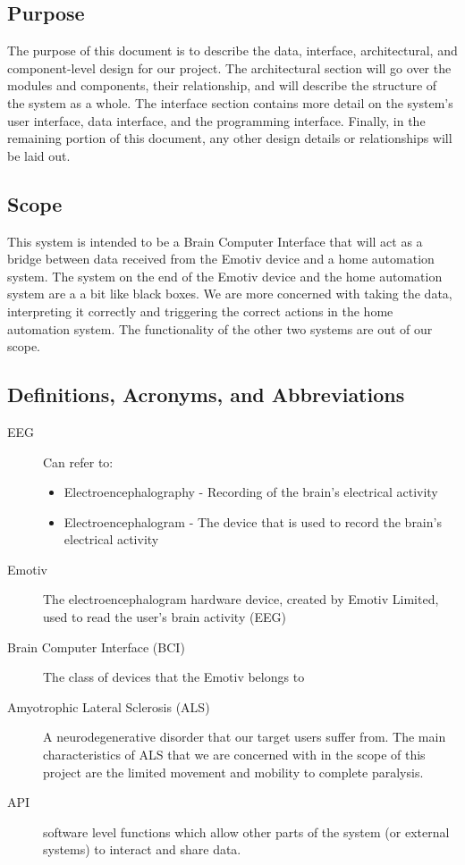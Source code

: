 \documentclass{article}
\begin{document}
\subsection{Purpose}
The purpose of this document is to describe the data, interface, architectural, and component-level design for our project. The architectural section will go over the modules and components, their relationship, and will describe the structure of the system as a whole. The interface section contains more detail on the system's user interface, data interface,  and the programming interface. Finally, in the remaining portion of this document, any other design details or relationships will be laid out.

\subsection{Scope}

This system is intended to be a Brain Computer Interface that will act as a bridge between data received from the Emotiv device and a home automation system. The system on the end of the Emotiv device and the home automation system are a a bit like black boxes. We are more concerned with taking the data, interpreting it correctly and triggering the correct actions in the home automation system. The functionality of the other two systems are out of our scope. 

\subsection{Definitions, Acronyms, and Abbreviations}
\begin{description}
    \item[EEG] Can refer to:
        \begin{itemize}
            \item Electroencephalography - Recording of the brain's electrical
                activity 
	        \item Electroencephalogram - The device that is used to record the
	            brain's electrical activity
        \end{itemize}
    \item[Emotiv] The electroencephalogram hardware device, created by Emotiv
        Limited, used to read the user's brain activity (EEG)
    \item[Brain Computer Interface (BCI)] The class of devices that the Emotiv
        belongs to
    \item[Amyotrophic Lateral Sclerosis (ALS)] A neurodegenerative disorder
        that our target users suffer from. The main characteristics of ALS
        that we are concerned with in the scope of this project are the
        limited movement and mobility to complete paralysis.
    \item[API] software level functions which allow other parts of the system (or external systems) to interact and share data.
\end{description}
\end{document}
